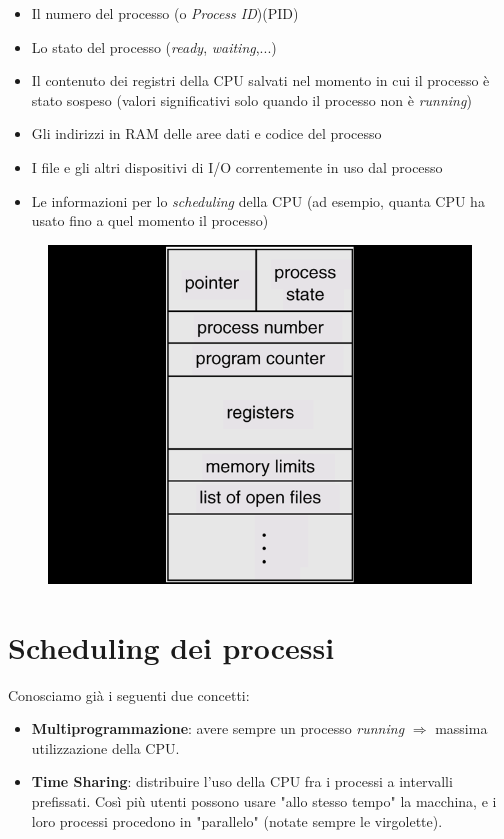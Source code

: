 \begin{itemize}
    \item Il numero del processo (o \textit{Process ID})(PID)
    \item Lo stato del processo (\textit{ready}, \textit{waiting},...)
    \item Il contenuto dei registri della CPU salvati nel momento in cui il processo è stato sospeso (valori significativi solo quando il processo non è \textit{running})
    \item Gli indirizzi in RAM delle aree dati e codice del processo
    \item I file e gli altri dispositivi di I/O correntemente in uso dal processo
    \item Le informazioni per lo \textit{scheduling} della CPU (ad esempio, quanta CPU ha usato fino a quel momento il processo)
\end{itemize}

\begin{figure}
    \centering
    \includegraphics[width=0.5\linewidth]{images/Process-Control-Block.png}
\end{figure}

\section{Scheduling dei processi}
Conosciamo già i seguenti due concetti:

\begin{itemize}
    \item \textbf{Multiprogrammazione}: avere sempre un processo \textit{running} \(\Rightarrow\) massima utilizzazione della CPU.
    \item \textbf{Time Sharing}: distribuire l'uso della CPU fra i processi a intervalli prefissati. Così più utenti possono usare "allo stesso tempo" la macchina, e i loro processi procedono in "parallelo" (notate sempre le virgolette).
\end{itemize}

